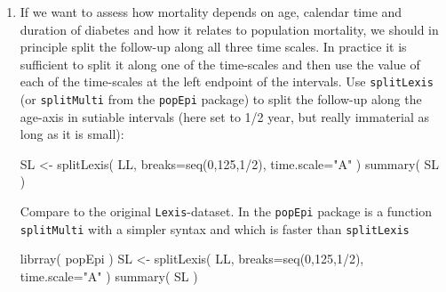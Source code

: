 \begin{enumerate}
\begin{Schunk}
\end{Schunk}
\item If we want to assess how mortality depends on age, calendar
  time and duration of diabetes and how it relates to population
  mortality, we should in principle split the follow-up along all
  three time scales. In practice it is sufficient to split it
  along one of the time-scales and then use the value of each of
  the time-scales at the left endpoint of the intervals.
  Use \texttt{splitLexis} (or \texttt{splitMulti} from the
  \texttt{popEpi} package) to split the follow-up along the
  age-axis in sutiable intervals (here set to 1/2 year, but really
  immaterial as long as it is small):
\begin{Schunk}
\begin{Sinput}
 SL <- splitLexis( LL, breaks=seq(0,125,1/2), time.scale="A" )
 summary( SL )
\end{Sinput}
\end{Schunk}
  Compare to the original \texttt{Lexis}-dataset.
  In the \texttt{popEpi} package is a function \texttt{splitMulti}
  with a simpler syntax and which is faster than \texttt{splitLexis}
\begin{Schunk}
\begin{Sinput}
 librray( popEpi )
 SL <- splitLexis( LL, breaks=seq(0,125,1/2), time.scale="A" )
 summary( SL )
\end{Sinput}
\end{Schunk}
\end{enumerate}
